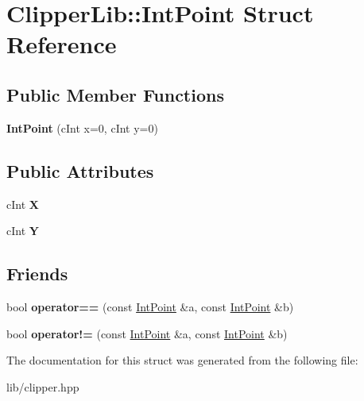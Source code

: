 \hypertarget{struct_clipper_lib_1_1_int_point}{}\section{Clipper\+Lib\+:\+:Int\+Point Struct Reference}
\label{struct_clipper_lib_1_1_int_point}
\subsection*{Public Member Functions}
\begin{DoxyCompactItemize}
\item 
\mbox{\label{struct_clipper_lib_1_1_int_point_a819e71f9269e99f151a3a99c4283cd43}} 
{\bfseries Int\+Point} (c\+Int x=0, c\+Int y=0)
\end{DoxyCompactItemize}
\subsection*{Public Attributes}
\begin{DoxyCompactItemize}
\item 
\mbox{\label{struct_clipper_lib_1_1_int_point_a608d16d39c8762e6c3c0a688efb310b6}} 
c\+Int {\bfseries X}
\item 
\mbox{\label{struct_clipper_lib_1_1_int_point_a8445d190cd9013bb34d49b5a8a240425}} 
c\+Int {\bfseries Y}
\end{DoxyCompactItemize}
\subsection*{Friends}
\begin{DoxyCompactItemize}
\item 
\mbox{\label{struct_clipper_lib_1_1_int_point_a6afef09ee09723a387e3046287e2635b}} 
bool {\bfseries operator==} (const \hyperlink{struct_clipper_lib_1_1_int_point}{Int\+Point} \&a, const \hyperlink{struct_clipper_lib_1_1_int_point}{Int\+Point} \&b)
\item 
\mbox{\label{struct_clipper_lib_1_1_int_point_aa37b2afb6cbc44cb9cd13ecc009decfb}} 
bool {\bfseries operator!=} (const \hyperlink{struct_clipper_lib_1_1_int_point}{Int\+Point} \&a, const \hyperlink{struct_clipper_lib_1_1_int_point}{Int\+Point} \&b)
\end{DoxyCompactItemize}


The documentation for this struct was generated from the following file\+:\begin{DoxyCompactItemize}
\item 
lib/clipper.\+hpp\end{DoxyCompactItemize}

